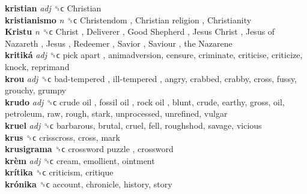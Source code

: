 \textbf{kristian} \emph{adj}  ␝ϲ   Christian   \\
\textbf{kristianismo} \emph{n}  ␝ϲ   Christendom ,  Christian religion ,  Christianity   \\
\textbf{Kristu} \emph{n}  ␝ϲ   Christ ,  Deliverer ,  Good Shepherd ,  Jesus Christ ,  Jesus of Nazareth ,  Jesus ,  Redeemer ,  Savior ,  Saviour ,  the Nazarene   \\
\textbf{kritiká} \emph{adj}  ␝ϲ   pick apart , animadversion, censure, criminate, criticise, criticize, knock, reprimand  \\
\textbf{krou} \emph{adj}  ␝ϲ   bad-tempered ,  ill-tempered , angry, crabbed, crabby, cross, fussy, grouchy, grumpy  \\
\textbf{krudo} \emph{adj}  ␝ϲ   crude oil ,  fossil oil ,  rock oil , blunt, crude, earthy, gross, oil, petroleum, raw, rough, stark, unprocessed, unrefined, vulgar  \\
\textbf{kruel} \emph{adj}  ␝ϲ  barbarous, brutal, cruel, fell, roughshod, savage, vicious  \\
\textbf{krus} ␝ϲ  crisscross, cross, mark  \\
\textbf{krusigrama} ␝ϲ   crossword puzzle , crossword  \\
\textbf{krèm} \emph{adj}  ␝ϲ  cream, emollient, ointment  \\
\textbf{krítika} ␝ϲ  criticism, critique  \\
\textbf{krónika} ␝ϲ  account, chronicle, history, story  \\
